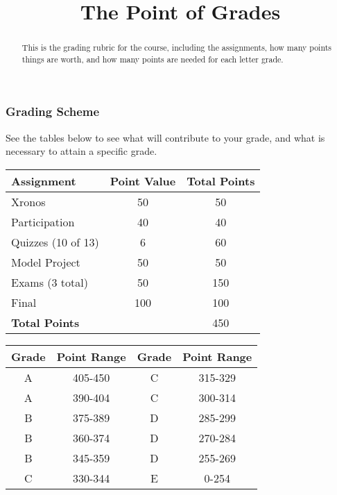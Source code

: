 \documentclass{ximeraXloud}
\title{The Point of Grades}
\begin{document}
\begin{abstract}
This is the grading rubric for the course, including the assignments, how many points things are worth, and how many points are needed for each letter grade.
\end{abstract}
\maketitle

\subsubsection*{Grading Scheme}

See the tables below to see what will contribute to your grade, and what is necessary to attain a specific grade.\\
\hspace{1cm}
\begin{tabular}{|lcc|}
    \hline \textbf{Assignment}          & \textbf{Point Value}          & \textbf{Total Points}\\ \hline 
    Xronos                              & 50                            & 50\\
    Participation                       & 40                            & 40\\
    Quizzes (10 of 13)                  & 6                             & 60\\
    Model Project                       & 50                            & 50\\    
    Exams (3 total)                     & 50                            & 150\\
    Final                               & 100                           & 100\\ \hline
    \textbf{Total Points}               &                               & 450\\ \hline
\end{tabular}
\begin{tabular}{|cccc|}
    \hline \textbf{Grade}       & \textbf{Point Range}      &\textbf{Grade}         & \textbf{Point Range}\\ \hline
    A                           & 405-450                   & C                     & 315-329\\
    A               & 390-404                   & C         & 300-314\\
    B                & 375-389                   & D          & 285-299\\
    B                           & 360-374                   & D                     & 270-284 \\
    B               & 345-359                   & D         & 255-269\\
    C                & 330-344                   & E                     & 0-254\\ \hline
\end{tabular}
\end{document}
